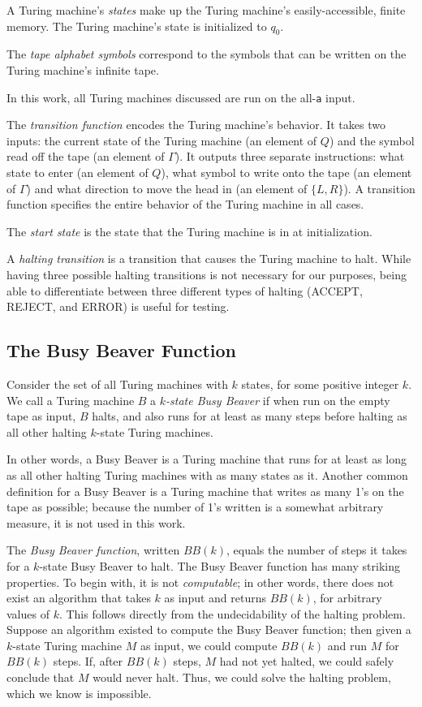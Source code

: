 \documentclass[11pt]{article}
\begin{document}
A Turing machine's \emph{states} make up the Turing machine's easily-accessible, finite memory. The Turing machine's state is initialized to $q_0$. 

The \emph{tape alphabet symbols} correspond to the symbols that can be written on the Turing machine's infinite tape. 

In this work, all Turing machines discussed are run on the all-\texttt{a} input. 

The \emph{transition function} encodes the Turing machine's behavior. It takes two inputs: the current state of the Turing machine (an element of $Q$) and the symbol read off the tape (an element of $\Gamma$). It outputs three separate instructions: what state to enter (an element of $Q$), what symbol to write onto the tape (an element of $\Gamma$) and what direction to move the head in (an element of $\{L, R\}$). A transition function specifies the entire behavior of the Turing machine in all cases. 

The \emph{start state} is the state that the Turing machine is in at initialization. 

A \emph{halting transition} is a transition that causes the Turing machine to halt. While having three possible halting transitions is not necessary for our purposes, being able to differentiate between three different types of halting (ACCEPT, REJECT, and ERROR) is useful for testing.

\subsection{The Busy Beaver Function}

Consider the set of all Turing machines with $k$ states, for some positive integer $k$. We call a Turing machine $B$ a $k$\emph{-state Busy Beaver} if when run on the empty tape as input, $B$ halts, and also runs for at least as many steps before halting as all other halting $k$-state Turing machines.~\cite{busybeaver} 

In other words, a Busy Beaver is a Turing machine that runs for at least as long as all other halting Turing machines with as many states as it. Another common definition for a Busy Beaver is a Turing machine that writes as many 1's on the tape as possible; because the number of 1's written is a somewhat arbitrary measure, it is not used in this work. 

The \emph{Busy Beaver function}, written $BB(k)$, equals the number of steps it takes for a $k$-state Busy Beaver to halt. The Busy Beaver function has many striking properties. To begin with, it is not \emph{computable}; in other words, there does not exist an algorithm that takes $k$ as input and returns $BB(k)$, for arbitrary values of $k$. This follows directly from the undecidability of the halting problem. Suppose an algorithm existed to compute the Busy Beaver function; then given a $k$-state Turing machine $M$ as input, we could compute $BB(k)$ and run $M$ for $BB(k)$ steps. If, after $BB(k)$ steps, $M$ had not yet halted, we could safely conclude that $M$ would never halt. Thus, we could solve the halting problem, which we know is impossible. 
\end{document}
